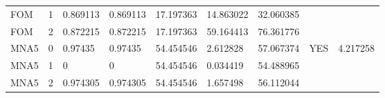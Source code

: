 \begin{table*}[h]
{\begin{tabular}{lllllll|ll}
FOM & 1 & 0.869113 & 0.869113 & 17.197363 & 14.863022 & 32.060385 &  &  \\
FOM & 2 & 0.872215 & 0.872215 & 17.197363 & 59.164413 & 76.361776 &  &  \\
MNA5 & 0 & 0.97435 & 0.97435 & 54.454546 & 2.612828 & 57.067374 & YES & 4.217258 \\
MNA5 & 1 & 0 & 0 & 54.454546 & 0.034419 & 54.488965 &  &  \\
MNA5 & 2 & 0.974305 & 0.974305 & 54.454546 & 1.657498 & 56.112044 &  &  \\
\hline
\end{tabular}%
}
\end{table*}
